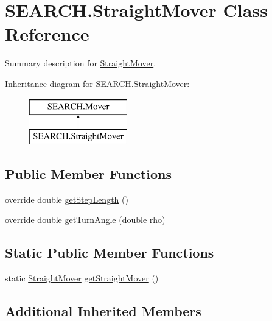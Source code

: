 \hypertarget{class_s_e_a_r_c_h_1_1_straight_mover}{\section{S\-E\-A\-R\-C\-H.\-Straight\-Mover Class Reference}
\label{class_s_e_a_r_c_h_1_1_straight_mover}
}


Summary description for \hyperlink{class_s_e_a_r_c_h_1_1_straight_mover}{Straight\-Mover}.  


Inheritance diagram for S\-E\-A\-R\-C\-H.\-Straight\-Mover\-:\begin{figure}[H]
\begin{center}
\leavevmode
\includegraphics[height=2.000000cm]{class_s_e_a_r_c_h_1_1_straight_mover}
\end{center}
\end{figure}
\subsection*{Public Member Functions}
\begin{DoxyCompactItemize}
\item 
override double \hyperlink{class_s_e_a_r_c_h_1_1_straight_mover_a146501b931a5784a3b68f7251048729f}{get\-Step\-Length} ()
\item 
override double \hyperlink{class_s_e_a_r_c_h_1_1_straight_mover_ad40a2a1e1e3103786928f7be8c30d5b1}{get\-Turn\-Angle} (double rho)
\end{DoxyCompactItemize}
\subsection*{Static Public Member Functions}
\begin{DoxyCompactItemize}
\item 
static \hyperlink{class_s_e_a_r_c_h_1_1_straight_mover}{Straight\-Mover} \hyperlink{class_s_e_a_r_c_h_1_1_straight_mover_acc3ba639a92903e9cfdaaa00d10d266b}{get\-Straight\-Mover} ()
\end{DoxyCompactItemize}
\subsection*{Additional Inherited Members}


